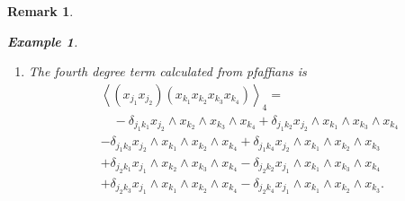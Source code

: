 \documentclass[aps,preprint]{revtex4}%
\newtheorem{example}[theorem]{Example}
\newtheorem{remark}[theorem]{Remark}
\begin{document}
\begin{remark}
\begin{example}
\begin{enumerate}
\begin{align}
{}\right)  x_{k_{2}}\wedge x_{k_{4}}+\operatorname*{Pf}\left(  \Delta
_{j_{1}j_{2}k_{1}k_{2}}\right)  x_{k_{3}}\wedge x_{k_{4}}%
\end{align}
and thus
\begin{align}
&  \left\langle \left(  x_{j_{1}}x_{j_{2}}\right)  \left(  x_{k_{1}}x_{k_{2}%
}x_{k_{3}}x_{k_{4}}\right)  \right\rangle _{2}=\nonumber\\
&  \quad x_{k_{1}}\wedge x_{k_{2}}\,\left(  \delta_{j_{2}k_{4}}\delta
_{j_{1}k_{3}}-\delta_{j_{2}k_{3}}\delta_{j_{1}k_{4}}\right)  -x_{k_{1}}\wedge
x_{k_{3}}\left(  \delta_{j_{1}k_{4}}\delta_{j_{2}k_{2}}-\delta_{j_{1}k_{2}%
}\delta_{j_{2}k_{4}}\right) \\
&  +x_{k_{1}}\wedge x_{k_{4}}\left(  \delta_{j_{1}k_{3}}\delta_{j_{2}k_{2}%
}-\delta_{j_{1}k_{2}}\delta_{j_{2}k_{3}}\right)  +x_{k_{2}}\wedge x_{k_{3}%
}\left(  \delta_{j_{1}k_{4}}\delta_{j_{2}k_{1}}-\delta_{j_{1}k_{1}}%
\delta_{j_{2}k_{4}}\right) \\
&  -x_{k_{2}}\wedge x_{k_{4}}\left(  \delta_{j_{1}k_{3}}\delta_{j_{2}k_{1}%
}-\delta_{j_{1}k_{1}}\delta_{j_{2}k_{3}}\right)  +x_{k_{3}}\wedge x_{k_{4}%
}\left(  \delta_{j_{1}k_{2}}\delta_{j_{2}k_{1}}-\delta_{j_{1}k_{1}}%
\delta_{j_{2}k_{2}}\right)  .
\end{align}


\item The \emph{fourth degree} term calculated from pfaffians is
\begin{align}
&  \left\langle \left(  x_{j_{1}}x_{j_{2}}\right)  \left(  x_{k_{1}}x_{k_{2}%
}x_{k_{3}}x_{k_{4}}\right)  \right\rangle _{4}=\nonumber\\
&  \quad-\delta_{j_{1}k_{1}}x_{j_{2}}\wedge x_{k_{2}}\wedge x_{k_{3}}\wedge
x_{k_{4}}+\delta_{j_{1}k_{2}}x_{j_{2}}\wedge x_{k_{1}}\wedge x_{k_{3}}\wedge
x_{k_{4}}\\
&  -\delta_{j_{1}k_{3}}x_{j_{2}}\wedge x_{k_{1}}\wedge x_{k_{2}}\wedge
x_{k_{4}}+\delta_{j_{1}k_{4}}x_{j_{2}}\wedge x_{k_{1}}\wedge x_{k_{2}}\wedge
x_{k_{3}}\nonumber\\
&  +\delta_{j_{2}k_{1}}x_{j_{1}}\wedge x_{k_{2}}\wedge x_{k_{3}}\wedge
x_{k_{4}}-\delta_{j_{2}k_{2}}x_{j_{1}}\wedge x_{k_{1}}\wedge x_{k_{3}}\wedge
x_{k_{4}}\\
&  +\delta_{j_{2}k_{3}}x_{j_{1}}\wedge x_{k_{1}}\wedge x_{k_{2}}\wedge
x_{k_{4}}-\delta_{j_{2}k_{4}}x_{j_{1}}\wedge x_{k_{1}}\wedge x_{k_{2}}\wedge
x_{k_{3}}.
\end{align}



\end{enumerate}
\end{example}
\end{remark}
\end{document}
